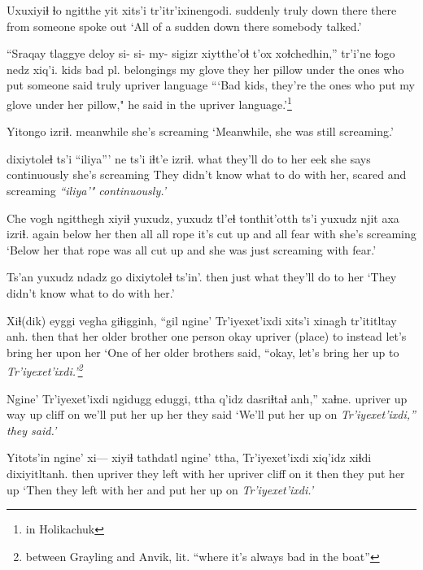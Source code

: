 \documentclass[12pt]{article}
\begin{document}
\gll Uxuxiyiɬ ɬo    ngitthe   yit   xits'i   tr'itr'ixinengodi.
suddenly truly {down there} there from  {someone spoke out}
\glt `All of a sudden down there somebody talked.'
\glend

\gll ``Sraqay tlaggye deloy {si- si- my-} sigizr     xiytthe'oɬ      t'ox  xoɬchedhin,''   tr'i'ne      ɬogo  nedz    xiq'i.
kids   {bad pl.} belongings {}    {my glove} {they her pillow} under {the ones who put } {someone said} truly upriver language
\glt ```Bad kids, they're the ones who put my glove under her pillow," he said in the upriver language.'\footnote{in Holikachuk}
\glend

\gll Yitongo   izriɬ.
meanwhile {she's screaming}
\glt `Meanwhile, she was still screaming.'
\glend

 dixiytoleɬ ts'i ``iliya''' ne ts'i iɬt'e izriɬ.
 what     {they'll do to her } {}    eek      {she says} {} continuously {she's screaming}
\glt  They didn't know what to do with her, scared and screaming \em ``iliya'" \em continuously.'
\glend

\gll Che {vogh ngitthegh} xiyiɬ yuxudz, yuxudz tl'eɬ tonthit'otth ts'i yuxudz njit axa izriɬ.
again {below her} then  all        all     rope  {it's cut up} and all     fear  with {she's screaming}
\glt `Below her that rope was all cut up and she was just screaming with fear.'
\glend

\gll Ts'an yuxudz {ndadz go} dixiytoleɬ ts'in'.
then  just     what     {they'll do to her}
\glt `They didn't know what to do with her.'
\glend

\gll Xiɬ(dik) eyggi vegha             giɬigginh, ``gil ngine'  Tr'iyexet'ixdi xits'i xinagh tr'ititltay anh.
then that  {her older brother} {one person} okay upriver (place) to instead   {let's bring her upon} her
\glt `One of her older brothers said, ``okay, let's bring her up to \em Tr'iyexet'ixdi\em .'\footnote{between Grayling and Anvik, lit. ``where it's always bad in the boat''}
\glend

\gll Ngine' Tr'iyexet'ixdi ngidugg eduggi,  ttha  q'idz dasriɬtaɬ anh,''    xaɬne.
upriver {}            up      {way up} cliff on  {we'll put her up} her {they said}
\glt `We'll put her up on \em Tr'iyexet'ixdi\em ,'' they said.'
\glend

\gll Yitots'in ngine' xi--- {xiyiɬ tathdatl}     ngine'  ttha,  Tr'iyexet'ixdi xiq'idz xiɬdi dixiyitltanh.
then      upriver {} {they left with her} upriver cliff {}        {on it}   then  {they put her up}
\glt `Then they left with her and put her up on \em Tr'iyexet'ixdi\em .'
\glend
\end{document}
